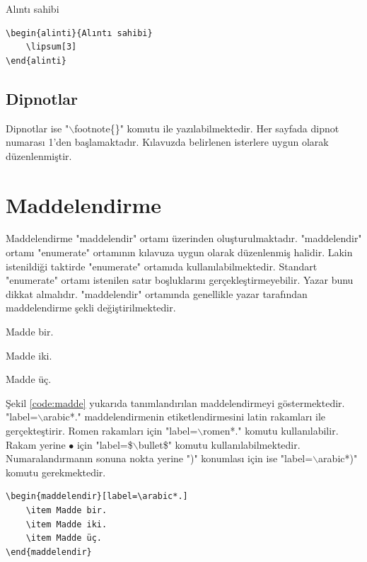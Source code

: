 \begin{alinti}{Alıntı sahibi}
	\lipsum[3]
\end{alinti}

\begin{lstlisting}[language={[LaTeX]{TeX}}, label=code:alinti, caption=Örnek alıntı yazımı]
\begin{alinti}{Alıntı sahibi}
	\lipsum[3]
\end{alinti}
\end{lstlisting}

\section{Dipnotlar}
Dipnotlar ise "$\backslash$footnote\{\}" komutu ile yazılabilmektedir. Her sayfada dipnot numarası 1'den başlamaktadır. Kılavuzda belirlenen isterlere uygun olarak düzenlenmiştir.


\chapter{Maddelendirme}
\label{ch:madde}
Maddelendirme "maddelendir" ortamı üzerinden oluşturulmaktadır. "maddelendir" ortamı "enumerate" ortamının kılavuza uygun olarak düzenlenmiş halidir. Lakin istenildiği taktirde "enumerate" ortamıda kullanılabilmektedir. Standart "enumerate" ortamı istenilen satır boşluklarını gerçekleştirmeyebilir. Yazar bunu dikkat almalıdır. "maddelendir" ortamında genellikle yazar tarafından maddelendirme şekli değiştirilmektedir. 

\begin{maddelendir}[label=\arabic*.]
	\item Madde bir.
	\item Madde iki.
	\item Madde üç.
\end{maddelendir}

Şekil \ref{code:madde} yukarıda tanımlandırılan maddelendirmeyi göstermektedir. "label=$\backslash$arabic*." maddelendirmenin etiketlendirmesini latin rakamları ile gerçekteştirir. Romen rakamları için  "label=$\backslash$romen*." komutu kullanılabilir. Rakam yerine $\bullet$ için "label=\$$\backslash$bullet\$" komutu kullanılabilmektedir. Numaralandırmanın sonuna nokta yerine ")" konumlası için ise  "label=$\backslash$arabic*)" komutu gerekmektedir.

\begin{lstlisting}[language={[LaTeX]{TeX}}, label=code:madde, caption=Örnek maddelendirme]
\begin{maddelendir}[label=\arabic*.]
	\item Madde bir.
	\item Madde iki.
	\item Madde üç.
\end{maddelendir}
\end{lstlisting}

